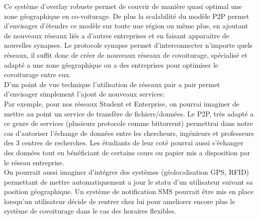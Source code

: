 Ce système d'overlay robuste permet de couvrir de manière quasi optimal une zone géographique en co-voiturage. De plus la scalabilité du modèle P2P permet d'envisager d'étendre ce modèle sur toute une région ou même plus, en ajoutant de nouveaux réseaux liés a d'autres entreprises et en faisant apparaitre de nouvelles synapses. Le protocole synapse permet d'interconnecter n'importe quels réseaux, il suffit donc de créer de nouveaux réseaux de covoiturage, spécialisé et adapté a une zone géographique ou a des entreprises pour optimiser le covoiturage entre eux.\\

D'un point de vue technique l'utilisation de réseaux pair a pair permet d'envisager simplement l'ajout de nouveaux services:\\
Par exemple, pour nos réseaux Student et Enterprise, on pourrai imaginer de mettre au point un service de transfère de fichiers/données. Le P2P, très adapté a ce genre de services (plusieurs protocole comme bittorrent) permettrai dans notre cas d'autoriser l'échange de données entre les chercheurs, ingénieurs et professeurs des 3 centres de recherches. Les étudiants de leur coté pourrai aussi s'échanger des données tout en bénéficiant de certains cours ou papier mis a disposition par le réseau entreprise.\\

On pourrait aussi imaginer d'intégrer des systèmes (géolocalisation GPS, RFID) permettant de mettre automatiquement a jour le statu d'un utilisateur suivant sa position géographique. Un système de notification SMS pourrait être mis en place lorsqu'un utilisateur décide de rentrer chez lui pour ameliorer encore plus le système de covoiturage dans le cas des horaires flexibles.




